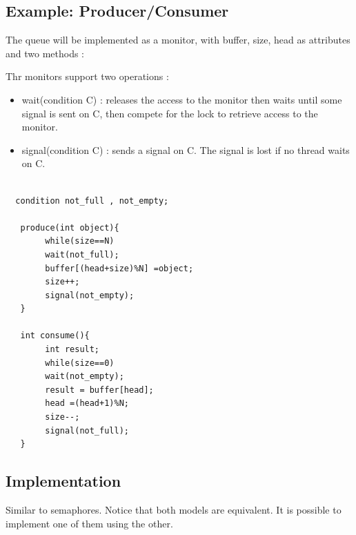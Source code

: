 \documentclass[a4paper,10pt]{article}
\begin{document}
\subsection{Example: Producer/Consumer}

The queue will be implemented as a monitor, with buffer, size, head as attributes and two methods :

Thr monitors support two operations :
\begin{itemize}
  \item wait(condition C) : releases the access to the monitor then waits until some signal is sent on C, then compete for the lock to retrieve access to the monitor.
  \item signal(condition C) : sends a signal on C. The signal is lost if no thread waits on C.
\end{itemize}
 
 
 \begin{verbatim}
 
  condition not_full , not_empty;
  
   produce(int object){
        while(size==N)
        wait(not_full);
        buffer[(head+size)%N] =object;
        size++;
        signal(not_empty);
   }
   
   int consume(){
        int result;
        while(size==0)
        wait(not_empty);
        result = buffer[head];
        head =(head+1)%N;
        size--;
        signal(not_full);
   }
 \end{verbatim}


\subsection{Implementation}

Similar to semaphores. Notice that both models are equivalent. It is possible to implement one of them using the other.
\end{document}
